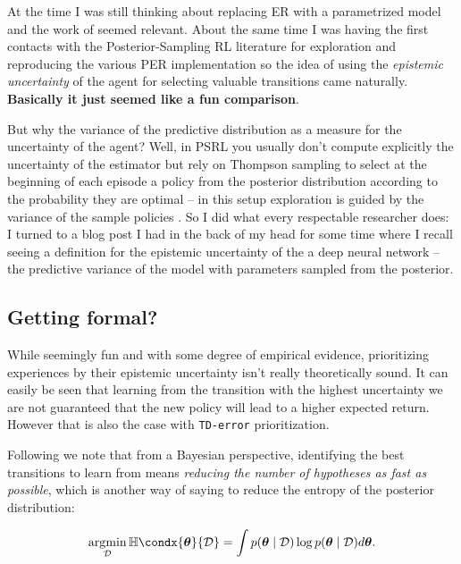 \documentclass[10pt,a4paper]{article} %
\newcommand{\btheta}{\bm{\theta}}
\newcommand{\data}{\ensuremath{\mathcal{D}}}
\newcommand{\posterior}{\ensuremath{p(\btheta \mid \data)}}
\newcommand{\argmin}[2]{\underset{#1}{\arg\!\min}\,#2}
\newcommand{\Entropy}{\mathbb{H}\condx}
\begin{document}
At the time I was still thinking about replacing ER with a parametrized model
and the work of \cite{mattar2018prioritized} seemed relevant. About the same
time I was having the first contacts with the Posterior-Sampling RL
literature for exploration
\autocite{russo2017thompsonTutorial,osband2018randomized} and reproducing the
various PER implementation so the idea of using the \textit{epistemic
uncertainty} of the agent for selecting valuable transitions came naturally.
\textbf{Basically it just seemed like a fun comparison}.

But why the variance of the predictive distribution as a measure for the
uncertainty of the agent? Well, in PSRL you usually don't compute explicitly
the uncertainty of the estimator but rely on Thompson sampling to select at
the beginning of each episode a policy from the posterior distribution
according to the probability they are optimal -- in this setup exploration is
guided by the variance of the sample policies \autocite{osband2013more}. So I
did what every respectable researcher does: I turned to a blog post
\autocite{gal2015what} I had in the back of my head for some time where I
recall seeing a definition for the epistemic uncertainty of the a deep neural
network -- the predictive variance of the model with parameters sampled from
the posterior.


\subsection{Getting formal?}

While seemingly fun and with some degree of empirical evidence, prioritizing
experiences by their epistemic uncertainty isn't really theoretically sound.
It can easily be seen that learning from the transition with the highest
uncertainty we are not guaranteed that the new policy will lead to a higher
expected return. However that is also the case with \texttt{TD-error}
prioritization.

Following \cite{Houlsby2011BayesianAL} we note that from a Bayesian
perspective, identifying the best transitions to learn from means
\emph{reducing the number of hypotheses as fast as possible}, which is
another way of saying to reduce the entropy of the posterior distribution:

\begin{equation*}
   \argmin{\data}{\Entropy{\btheta}{\data}} = 
        \int \posterior \log \posterior d\btheta.
\end{equation*}
\end{document}
